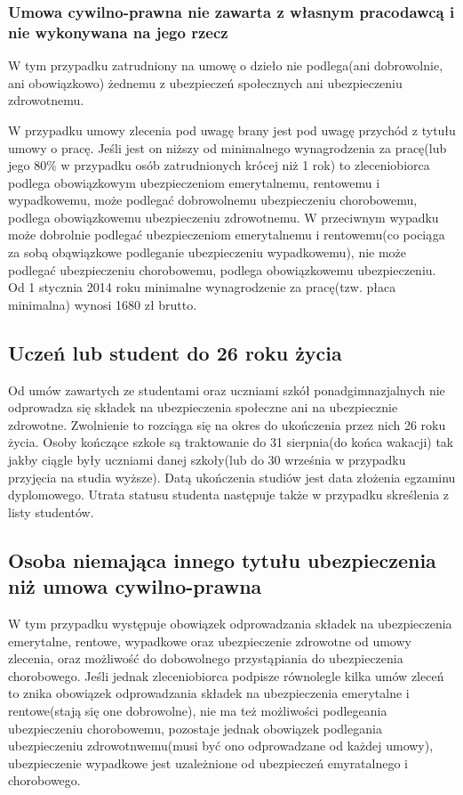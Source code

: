 \subsubsection{Umowa cywilno-prawna nie zawarta z własnym pracodawcą i nie wykonywana na jego rzecz}
W tym przypadku zatrudniony na umowę o dzieło nie podlega(ani dobrowolnie, ani obowiązkowo) żednemu z ubezpieczeń społecznych ani ubezpieczeniu zdrowotnemu. 

W przypadku umowy zlecenia pod uwagę brany jest pod uwagę przychód z tytułu umowy o pracę. Jeśli jest on niższy od minimalnego wynagrodzenia za pracę(lub jego 80\% w przypadku osób zatrudnionych krócej niż 1 rok) to zleceniobiorca podlega obowiązkowym ubezpieczeniom emerytalnemu, rentowemu i wypadkowemu, może podlegać dobrowolnemu ubezpieczeniu chorobowemu, podlega obowiązkowemu ubezpieczeniu zdrowotnemu. W przeciwnym wypadku może dobrolnie podlegać ubezpieczeniom emerytalnemu i rentowemu(co pociąga za sobą obąwiązkowe podleganie ubezpieczeniu wypadkowemu), nie może podlegać ubezpieczeniu chorobowemu, podlega obowiązkowemu ubezpieczeniu. Od 1 stycznia 2014 roku minimalne wynagrodzenie za pracę(tzw. płaca minimalna) wynosi 1680 zł brutto.

\subsection[Uczeń lub student do 26 roku życia][Uczeń lub student do 26 roku życia]{Uczeń lub student do 26 roku życia}
Od umów zawartych ze studentami oraz uczniami szkół ponadgimnazjalnych nie odprowadza się składek na ubezpieczenia społeczne ani na ubezpiecznie zdrowotne. Zwolnienie to rozciąga się na okres do ukończenia przez nich 26 roku życia. Osoby kończące szkołe są traktowanie do 31 sierpnia(do końca wakacji)  tak jakby ciągle były uczniami danej szkoły(lub do 30 września w przypadku przyjęcia na studia wyższe). Datą ukończenia studiów jest data złożenia egzaminu dyplomowego. Utrata statusu studenta następuje także w przypadku skreślenia z listy studentów.

\subsection[Osoba niemająca innego tytułu ubezpieczenia niż umowa cywilno-prawna][Osoba niemająca innego tytułu ubezpieczenia niż umowa cywilno-prawna]{Osoba niemająca innego tytułu ubezpieczenia niż umowa cywilno-prawna}
\label{inni}
W tym przypadku występuje obowiązek odprowadzania składek na ubezpieczenia emerytalne, rentowe, wypadkowe oraz ubezpieczenie zdrowotne od umowy zlecenia, oraz możliwość do dobowolnego przystąpiania do ubezpieczenia chorobowego. Jeśli jednak zleceniobiorca podpisze równolegle kilka umów zleceń to znika obowiązek odprowadzania składek na ubezpieczenia emerytalne i rentowe(stają się one dobrowolne), nie ma też możliwości podlegeania ubezpieczeniu chorobowemu, pozostaje jednak obowiązek podlegania ubezpieczeniu zdrowotnwemu(musi być ono odprowadzane od każdej umowy), ubezpieczenie wypadkowe jest uzależnione od ubezpieczeń emyratalnego i chorobowego.

